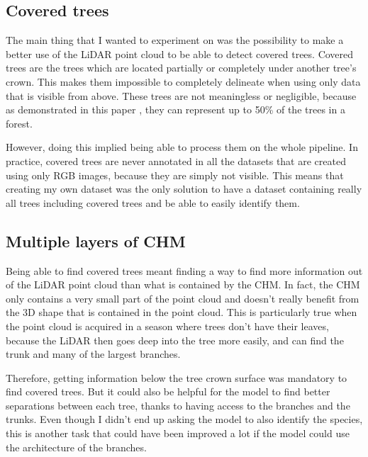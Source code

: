 \documentclass[
  letterpaper,
  DIV=11,
  numbers=noendperiod]{scrartcl}
\begin{document}
\subsection{Covered trees}\label{sec-obj-covered_trees}

The main thing that I wanted to experiment on was the possibility to
make a better use of the LiDAR point cloud to be able to detect covered
trees. Covered trees are the trees which are located partially or
completely under another tree's crown. This makes them impossible to
completely delineate when using only data that is visible from above.
These trees are not meaningless or negligible, because as demonstrated
in this paper \autocite{lidar_benchmark_2}, they can represent up to
50\% of the trees in a forest.

However, doing this implied being able to process them on the whole
pipeline. In practice, covered trees are never annotated in all the
datasets that are created using only RGB images, because they are simply
not visible. This means that creating my own dataset was the only
solution to have a dataset containing really all trees including covered
trees and be able to easily identify them.

\subsection{Multiple layers of CHM}\label{multiple-layers-of-chm}

Being able to find covered trees meant finding a way to find more
information out of the LiDAR point cloud than what is contained by the
CHM. In fact, the CHM only contains a very small part of the point cloud
and doesn't really benefit from the 3D shape that is contained in the
point cloud. This is particularly true when the point cloud is acquired
in a season where trees don't have their leaves, because the LiDAR then
goes deep into the tree more easily, and can find the trunk and many of
the largest branches.

Therefore, getting information below the tree crown surface was
mandatory to find covered trees. But it could also be helpful for the
model to find better separations between each tree, thanks to having
access to the branches and the trunks. Even though I didn't end up
asking the model to also identify the species, this is another task that
could have been improved a lot if the model could use the architecture
of the branches.
\end{document}
